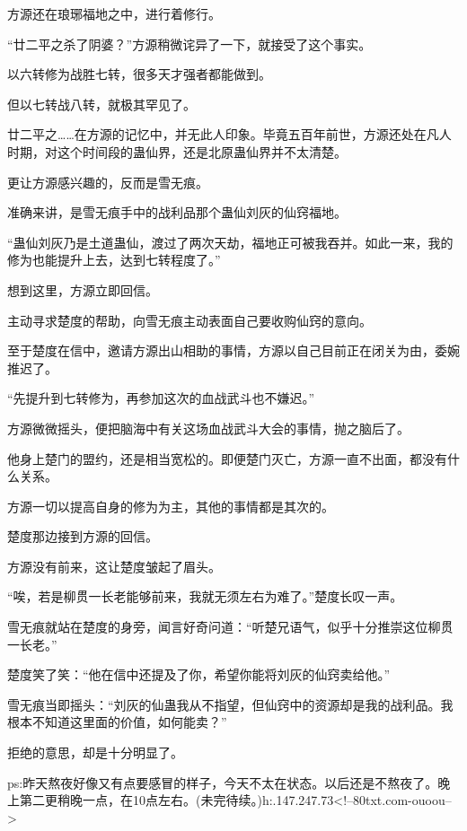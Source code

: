 \begin{this_body}
方源还在琅琊福地之中，进行着修行。

“廿二平之杀了阴婆？”方源稍微诧异了一下，就接受了这个事实。

以六转修为战胜七转，很多天才强者都能做到。

但以七转战八转，就极其罕见了。

廿二平之……在方源的记忆中，并无此人印象。毕竟五百年前世，方源还处在凡人时期，对这个时间段的蛊仙界，还是北原蛊仙界并不太清楚。

更让方源感兴趣的，反而是雪无痕。

准确来讲，是雪无痕手中的战利品那个蛊仙刘灰的仙窍福地。

“蛊仙刘灰乃是土道蛊仙，渡过了两次天劫，福地正可被我吞并。如此一来，我的修为也能提升上去，达到七转程度了。”

想到这里，方源立即回信。

主动寻求楚度的帮助，向雪无痕主动表面自己要收购仙窍的意向。

至于楚度在信中，邀请方源出山相助的事情，方源以自己目前正在闭关为由，委婉推迟了。

“先提升到七转修为，再参加这次的血战武斗也不嫌迟。”

方源微微摇头，便把脑海中有关这场血战武斗大会的事情，抛之脑后了。

他身上楚门的盟约，还是相当宽松的。即便楚门灭亡，方源一直不出面，都没有什么关系。

方源一切以提高自身的修为为主，其他的事情都是其次的。

楚度那边接到方源的回信。

方源没有前来，这让楚度皱起了眉头。

“唉，若是柳贯一长老能够前来，我就无须左右为难了。”楚度长叹一声。

雪无痕就站在楚度的身旁，闻言好奇问道：“听楚兄语气，似乎十分推崇这位柳贯一长老。”

楚度笑了笑：“他在信中还提及了你，希望你能将刘灰的仙窍卖给他。”

雪无痕当即摇头：“刘灰的仙蛊我从不指望，但仙窍中的资源却是我的战利品。我根本不知道这里面的价值，如何能卖？”

拒绝的意思，却是十分明显了。

ps:昨天熬夜好像又有点要感冒的样子，今天不太在状态。以后还是不熬夜了。晚上第二更稍晚一点，在10点左右。(未完待续。)h:.147.247.73<!--80txt.com-ouoou-->

\end{this_body}

